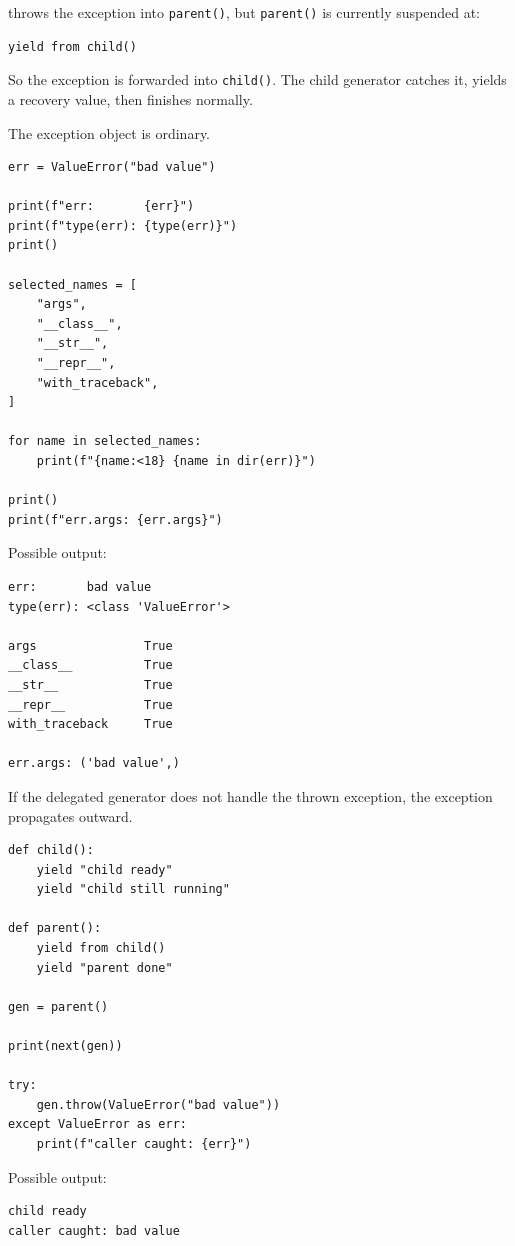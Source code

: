 throws the exception into \texttt{parent()}, but \texttt{parent()} is currently suspended at:

\begin{verbatim}
yield from child()
\end{verbatim}

So the exception is forwarded into \texttt{child()}. The child generator catches it, yields a recovery value, then finishes normally.

The exception object is ordinary.

\begin{verbatim}
err = ValueError("bad value")

print(f"err:       {err}")
print(f"type(err): {type(err)}")
print()

selected_names = [
    "args",
    "__class__",
    "__str__",
    "__repr__",
    "with_traceback",
]

for name in selected_names:
    print(f"{name:<18} {name in dir(err)}")

print()
print(f"err.args: {err.args}")
\end{verbatim}

Possible output:

\begin{verbatim}
err:       bad value
type(err): <class 'ValueError'>

args               True
__class__          True
__str__            True
__repr__           True
with_traceback     True

err.args: ('bad value',)
\end{verbatim}

If the delegated generator does not handle the thrown exception, the exception propagates outward.

\begin{verbatim}
def child():
    yield "child ready"
    yield "child still running"

def parent():
    yield from child()
    yield "parent done"

gen = parent()

print(next(gen))

try:
    gen.throw(ValueError("bad value"))
except ValueError as err:
    print(f"caller caught: {err}")
\end{verbatim}

Possible output:

\begin{verbatim}
child ready
caller caught: bad value
\end{verbatim}

